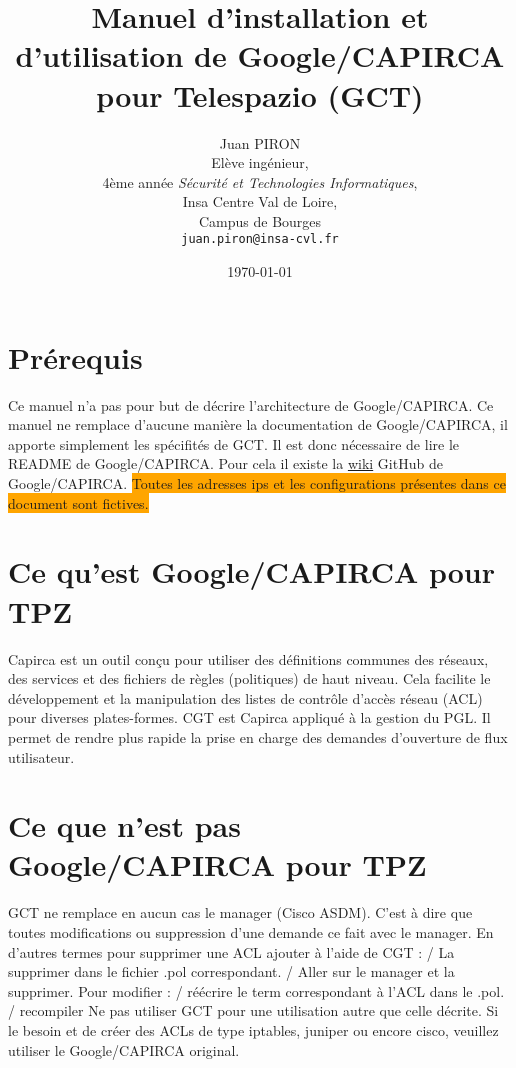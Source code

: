 \documentclass{article}
\title{Manuel d'installation et d'utilisation de Google/CAPIRCA pour Telespazio (GCT)}
\author{Juan PIRON\\
   Elève ingénieur,\\
   4ème année \textit{Sécurité et Technologies Informatiques},\\
   {\color{red} Insa Centre Val de Loire},\\
   {\color{green} Campus de Bourges}\\
   \texttt{juan.piron@insa-cvl.fr}
}
\date{\today}
\begin{document}
  \maketitle

  \newpage
  \tableofcontents
  \newpage

  \section{Prérequis}

    Ce manuel n'a pas pour but de décrire l'architecture de Google/CAPIRCA.
    Ce manuel ne remplace d'aucune manière la documentation de Google/CAPIRCA, il apporte simplement les spécifités de GCT.
    Il est donc nécessaire de lire le README de Google/CAPIRCA.
    Pour cela il existe la \href{https://github.com/google/capirca/wiki}{wiki} GitHub de Google/CAPIRCA.
    \colorbox{orange}{Toutes les adresses ips et les configurations présentes dans ce document sont fictives.}

  \section{Ce qu'est Google/CAPIRCA pour TPZ}

    Capirca est un outil conçu pour utiliser des définitions communes des réseaux, des services et des fichiers de règles (politiques) de haut niveau.
    Cela facilite le développement et la manipulation des listes de contrôle d'accès réseau (ACL) pour diverses plates-formes.
    CGT est Capirca appliqué à la gestion du PGL. Il permet de rendre plus rapide la prise en charge des demandes d'ouverture de flux utilisateur.
    \smallbreak

  \section{Ce que n'est pas Google/CAPIRCA pour TPZ}

    GCT ne remplace en aucun cas le manager (Cisco ASDM). C'est à dire que toutes modifications ou suppression d'une demande ce fait avec le manager.
    En d'autres termes pour supprimer une ACL ajouter à l'aide de CGT : / La supprimer dans le fichier .pol correspondant. / Aller sur le manager et la supprimer. \bigbreak
    \noindent Pour modifier : / réécrire le term correspondant à l'ACL dans le .pol. / recompiler \smallbreak
    Ne pas utiliser GCT pour une utilisation autre que celle décrite. Si le besoin et de créer des ACLs de type iptables,
    juniper ou encore cisco, veuillez utiliser le Google/CAPIRCA original.
\end{document}
